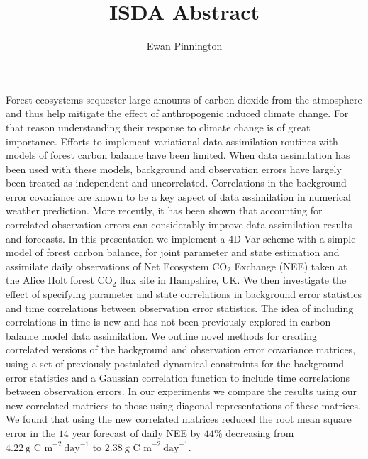 \documentclass[11pt]{article}
\title{ISDA Abstract}
\author{Ewan Pinnington}
\begin{document}
\maketitle

Forest ecosystems sequester large amounts of carbon-dioxide from the atmosphere and thus help mitigate the effect of anthropogenic induced climate change. For that reason understanding their response to climate change is of great importance. Efforts to implement variational data assimilation routines with models of forest carbon balance have been limited. When data assimilation has been used with these models, background and observation errors have largely been treated as independent and uncorrelated. Correlations in the background error covariance are known to be a key aspect of data assimilation in numerical weather prediction. More recently, it has been shown that accounting for correlated observation errors can considerably improve data assimilation results and forecasts. In this presentation we implement a 4D-Var scheme with a simple model of forest carbon balance, for joint parameter and state estimation and assimilate daily observations of Net Ecosystem $\text{CO}_{2}$ Exchange (NEE) taken at the Alice Holt forest $\text{CO}_2$ flux site in Hampshire, UK. We then investigate the effect of specifying parameter and state correlations in background error statistics and time correlations between observation error statistics. The idea of including correlations in time is new and has not been previously explored in carbon balance model data assimilation. We outline novel methods for creating correlated versions of the background and observation error covariance matrices, using a set of previously postulated dynamical constraints for the background error statistics and a Gaussian correlation function to include time correlations between observation errors. In our experiments we compare the results using our new correlated matrices to those using diagonal representations of these matrices. We found that using the new correlated matrices reduced the root mean square error in the $14$ year forecast of daily NEE by $44\%$ decreasing from $4.22~\text{g~C~m}^{-2}~\text{day}^{-1}$ to $2.38~\text{g~C~m}^{-2}~\text{day}^{-1}$.     
\end{document}

